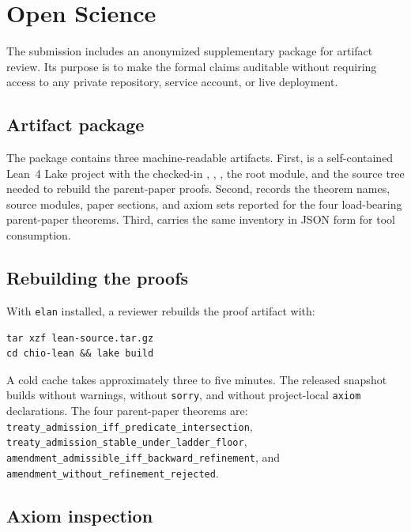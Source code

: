 \section{Open Science}
\label{sec:open-science}

The submission includes an anonymized supplementary package for
artifact review. Its purpose is to make the formal claims auditable
without requiring access to any private repository, service account, or
live deployment.

\subsection{Artifact package}
\label{sec:open-science:package}

The package contains three machine-readable artifacts. First,
 is a self-contained Lean~4 Lake project with
the checked-in , ,
, the  root module, and the
 source tree needed to rebuild the parent-paper proofs.
Second,  records the theorem names, source
modules, paper sections, and axiom sets reported for the four
load-bearing parent-paper theorems. Third,
 carries the same inventory in JSON form
for tool consumption.

\subsection{Rebuilding the proofs}
\label{sec:open-science:rebuild}

With \texttt{elan} installed, a reviewer rebuilds the proof artifact
with:

\begin{verbatim}
tar xzf lean-source.tar.gz
cd chio-lean && lake build
\end{verbatim}

A cold cache takes approximately three to five minutes. The released
snapshot builds without warnings, without \texttt{sorry}, and without
project-local \texttt{axiom} declarations. The four parent-paper
theorems are:
\texttt{treaty\_admission\_iff\_predicate\_intersection},
\texttt{treaty\_admission\_stable\_under\_ladder\_floor},
\texttt{amendment\_admissible\_iff\_backward\_refinement}, and
\texttt{amendment\_without\_refinement\_rejected}.

\subsection{Axiom inspection}
\label{sec:open-science:axioms}

